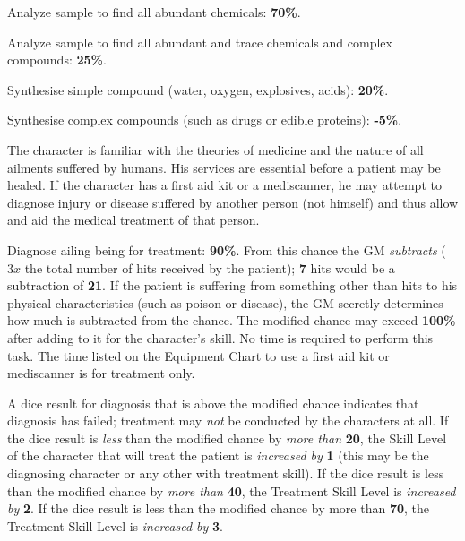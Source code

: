\begin{tasklist}
\item Analyze sample to find all abundant chemicals: \textbf{70\%}.
\item Analyze sample to find all abundant and trace chemicals and
  complex compounds: \textbf{25\%}.
\item Synthesise simple compound (water, oxygen, explosives, acids):
  \textbf{20\%}.
\item Synthesise complex compounds (such as drugs or edible proteins):
  \textbf{-5\%}.
\end{tasklist}

\label{sec:skill-diagnosis}

The character is familiar with the theories of medicine and the nature
of all ailments suffered by humans.  His services are essential before
a patient may be healed.  If the character has a first aid kit or a
mediscanner, he may attempt to diagnose injury or disease suffered by
another person (not himself) and thus allow and aid the medical
treatment of that person.

\begin{tasklist}
\item Diagnose ailing being for treatment: \textbf{90\%}.  From this
  chance the GM \emph{subtracts} ($3 x$ the total number of hits
  received by the patient); \textbf{7} hits would be a subtraction of
  \textbf{21}.  If the patient is suffering from something other than
  hits to his physical characteristics (such as poison or disease),
  the GM secretly determines how much is subtracted from the chance.
  The modified chance may exceed \textbf{100\%} after adding to it for
  the character's skill.  No time is required to perform this task.
  The time listed on the Equipment Chart to use a first aid kit or
  mediscanner is for treatment only.
\end{tasklist}

A dice result for diagnosis that is above the modified chance
indicates that diagnosis has failed; treatment may \emph{not} be
conducted by the characters at all.  If the dice result is \emph{less}
than the modified chance by \emph{more than} \textbf{20}, the Skill
Level of the character that will treat the patient is \emph{increased
  by} \textbf{1} (this may be the diagnosing character or any other
with treatment skill).  If the dice result is less than the modified
chance by \emph{more than} \textbf{40}, the Treatment Skill Level is
\emph{increased by} \textbf{2}.  If the dice result is less than the
modified chance by more than \textbf{70}, the Treatment Skill Level is
\emph{increased by} \textbf{3}.

